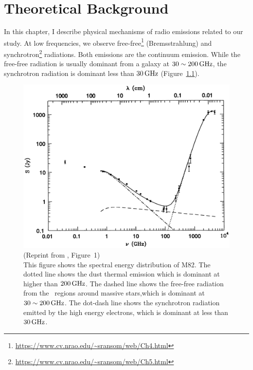\chapter{Theoretical Background}\label{chap:theory}
\begin{chapabstract}

    In this chapter, I describe physical mechanisms of radio emissions related to our study.
    At low frequencies, we observe free-free\footnote{\url{https://www.cv.nrao.edu/~sransom/web/Ch4.html}} (Bremsstrahlung) and synchrotron\footnote{\url{https://www.cv.nrao.edu/~sransom/web/Ch5.html}} radiations.
    Both emissions are the continuum emission.
    While the free-free radiation is usually dominant from a galaxy at $30 \sim 200\,\mathrm{GHz}$, the synchrotron radiation is dominant less than $30\,\mathrm{GHz}$ (Figure~\ref{fig:Condon1992_figure1}).\\ \vspace{0.2cm}
\begin{figure}[htbp]
	\centering
	\includegraphics[width=.7\linewidth]{Chapter_2/Figures/Condon1992_Figure1.png}
    \caption[Reprint from \citet{Condon1992a} (Figure~1)]{\label{fig:Condon1992_figure1}
        (Reprint from \citet{Condon1992a}, Figure~1)\\
        This figure shows the spectral energy distribution of M82.
        The dotted line shows the dust thermal emission which is dominant at higher than $200\,\mathrm{GHz}$.
        The dashed line shows the free-free radiation from the \ih~regions around massive stars,which is dominant at $30 \sim 200\,\mathrm{GHz}$.
        The dot-dash line shows the synchrotron radiation emitted by the high energy electrons, which is dominant at less than $30\,\mathrm{GHz}$.
    }
\end{figure}

\end{chapabstract}



